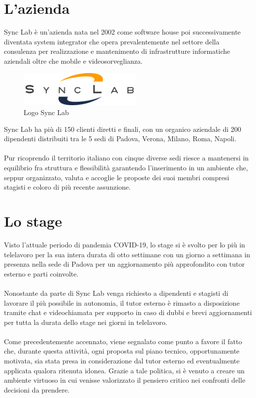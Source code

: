 \section{L'azienda}
Sync Lab è un'azienda nata nel 2002 come software house poi successivamente diventata system integrator che opera prevalentemente nel settore della consulenza per realizzazione e mantenimento di infrastrutture informatiche aziendali oltre che mobile e videosorveglianza.

\begin{figure}[h!]
    \centering
    \includegraphics[width=6cm]{immagini/logo_synclab.png}
    \caption{Logo Sync Lab}
\end{figure}

\noindent Sync Lab ha più di 150 clienti diretti e finali, con un organico aziendale di 200 dipendenti distribuiti tra le 5 sedi di Padova, Verona, Milano, Roma, Napoli.
\\\\
\noindent Pur ricoprendo il territorio italiano con cinque diverse sedi  riesce a mantenersi in equilibrio fra struttura e flessibilità garantendo l'inserimento in un ambiente che, seppur organizzato, valuta e accoglie le proposte dei suoi membri compresi stagisti e coloro di più recente assunzione.

\section{Lo stage}
Visto l'attuale periodo di pandemia COVID-19, lo stage si è svolto per lo più in telelavoro per la sua intera durata di otto settimane con un giorno a settimana in presenza nella sede di Padova per un aggiornamento più approfondito con tutor esterno e parti coinvolte.
\\\\
Nonostante da parte di Sync Lab venga richiesto a dipendenti e stagisti di lavorare il più possibile in autonomia, il tutor esterno è rimasto a disposizione tramite chat e videochiamata per supporto in caso di dubbi e brevi aggiornamenti per tutta la durata dello stage nei giorni in telelavoro.
\\\\
Come precedentemente accennato, viene segnalato come punto a favore il fatto che, durante questa attività, ogni proposta sul piano tecnico, opportunamente motivata, sia stata presa in considerazione dal tutor esterno ed eventualmente applicata qualora ritenuta idonea. Grazie a tale politica, si è venuto a creare un ambiente virtuoso in cui venisse valorizzato il pensiero critico nei confronti delle decisioni da prendere.